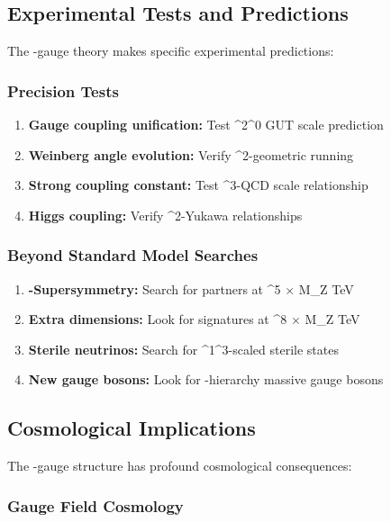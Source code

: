 \subsection{Experimental Tests and Predictions}

The \phi-gauge theory makes specific experimental predictions:

\subsubsection{Precision Tests}

\begin{enumerate}
\item \textbf{Gauge coupling unification:} Test \phi^2^0 GUT scale prediction
\item \textbf{Weinberg angle evolution:} Verify \phi^2-geometric running
\item \textbf{Strong coupling constant:} Test \phi^3-QCD scale relationship
\item \textbf{Higgs coupling:} Verify \phi^2-Yukawa relationships
\end{enumerate}

\subsubsection{Beyond Standard Model Searches}

\begin{enumerate}
\item \textbf{\phi-Supersymmetry:} Search for partners at \phi^5 $\times$ M_Z  TeV
\item \textbf{Extra dimensions:} Look for signatures at \phi^8 $\times$ M_Z  TeV
\item \textbf{Sterile neutrinos:} Search for \phi^1^3-scaled sterile states
\item \textbf{New gauge bosons:} Look for \phi-hierarchy massive gauge bosons
\end{enumerate}

\subsection{Cosmological Implications}

The \phi-gauge structure has profound cosmological consequences:

\subsubsection{Gauge Field Cosmology}

